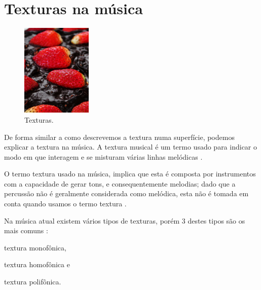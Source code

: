 \newpage

\section{Texturas na música}
\label{sec:texturasmusica}
\begin{figure}
    \centering 
    \vspace{-10pt}
    \includegraphics[width=0.30\textwidth]{chapters/cap-musicalidade-percepcion/textura.jpg}
  \caption{Texturas.}
    \vspace{-10pt}
\end{figure}
De forma similar a como descrevemos a textura numa superfície,
podemos explicar a textura na música.
A textura musical é um termo usado para indicar o modo em que interagem e 
se misturam várias linhas melódicas \cite[pp. 29]{kerman2015listen}.


O termo textura usado na música, 
implica que esta é composta por instrumentos com a capacidade de gerar tons,
e consequentemente melodias;
dado que a percussão não é geralmente considerada como melódica, 
esta não é tomada em conta quando usamos o termo textura \cite[pp. 59]{holland2013music}.

Na música atual existem  vários tipos de texturas, 
porém 3 destes tipos  são os mais comuns 
\cite[pp. 77]{copland1974ouvir} \cite[pp. 29]{kerman2015listen} \cite[pp. 322]{harnum2009basic}:
\begin{inparaitem}
\item textura monofônica, 
\item textura homofônica e
\item textura polifônica.
\end{inparaitem}

 
